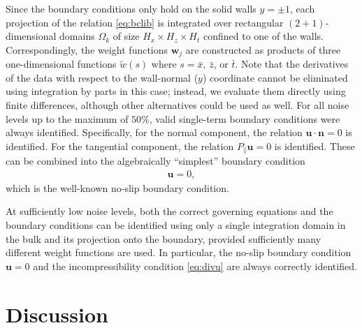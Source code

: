 \documentclass[preprint]{article}
\def\bi#1{\textbf{#1}}
\begin{document}
Since the boundary conditions only hold on the solid walls $y=\pm 1$, each projection of the relation \eqref{eq:bclib} is integrated over rectangular $(2+1)$-dimensional domains $\Omega_k$ of size $H_x \times H_z \times H_t$ confined to one of the walls. Correspondingly, the weight functions ${\bi w}_j$ are constructed as products of three one-dimensional functions $\tilde{w}(s)$ where $s=\bar{x}$, $\bar{z}$, or $\bar{t}$. Note that the derivatives of the data with respect to the wall-normal ($y$) coordinate cannot be eliminated using integration by parts in this case; instead, we evaluate them directly using finite differences, although other alternatives could be used as well.
For all noise levels up to the maximum of $50\%$, valid single-term boundary conditions were always identified. Specifically, for the normal component, 
the relation ${\bi u} \cdot {\bi n} = 0$ is 
identified. For the tangential component, the relation $P_\parallel {\bi u} = 0$ is identified. These can be combined into the algebraically ``simplest'' boundary condition
\begin{align}\label{eq:bc}
    {\bi u}=0,
\end{align}
which is the well-known no-slip boundary condition.

At sufficiently low noise levels, both the correct governing equations and the boundary conditions can be identified using only a single integration domain in the bulk and its projection onto the boundary, provided sufficiently many different weight functions are used. In particular, the no-slip boundary condition ${\bi u}=0$ and the incompressibility condition \eqref{eq:divu} are always correctly identified. 

\section{Discussion}
\label{sec:disc}
\end{document}

